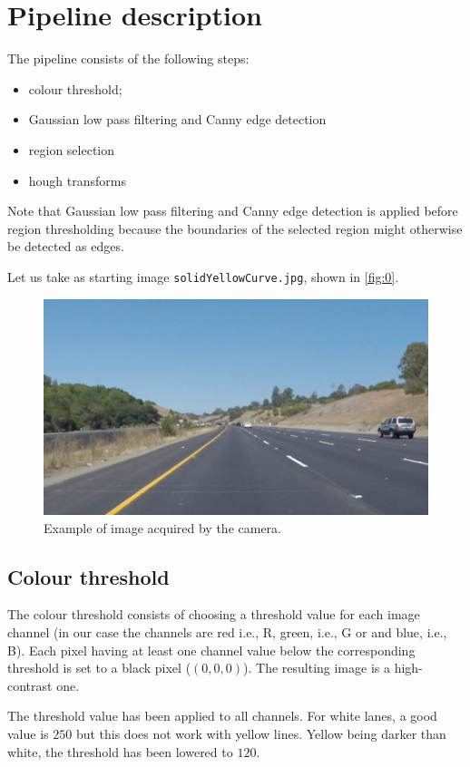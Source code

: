 \documentclass{article}
\let\cd\lstinline
\begin{document}
\section{Pipeline description}
The pipeline consists of the following steps:
\begin{itemize}	
\item colour threshold;
\item Gaussian low pass filtering and Canny edge detection
\item region selection
\item hough transforms
\end{itemize}
Note that  Gaussian low pass filtering and Canny edge detection is applied before region thresholding because the boundaries of the selected region might otherwise be detected as edges.

Let us take as starting image \cd+solidYellowCurve.jpg+, shown in \autoref{fig:0}.
\begin{figure}
\centering
\includegraphics[scale=0.4]{lane_detection_steps/solidYellowCurve/0.jpg}
\caption{Example of image acquired by the camera.}
\label{fig:0}
\end{figure}
\subsection{Colour threshold}
The colour threshold consists of choosing a threshold value for each image channel (in our case the channels are red i.e., R, green, i.e., G or and blue, i.e., B). Each pixel having at least one channel value below the corresponding threshold is set to a black pixel ($(0, 0, 0)$). The resulting image is a high-contrast one.

The threshold value has been applied to all channels. For white lanes, a good value is $250$ but this does not work with yellow lines. Yellow being darker than white, the threshold has been lowered to $120$.
\end{document}
